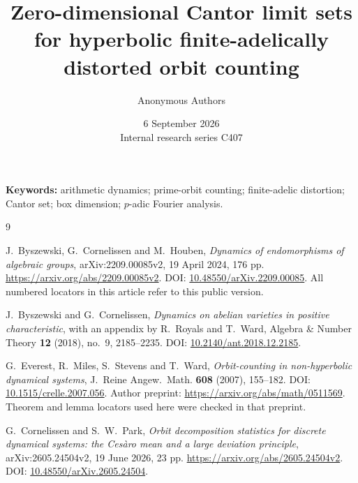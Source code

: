 \documentclass[11pt]{article}
\title{Zero-dimensional Cantor limit sets for hyperbolic\newline
finite-adelically distorted orbit counting}
\author{Anonymous Authors}
\date{6 September 2026\\[3pt]{\small Internal research series C407}}
\begin{document}
\maketitle
\begin{abstract}

\end{abstract}
\noindent\textbf{Keywords:} arithmetic dynamics; prime-orbit counting;
finite-adelic distortion; Cantor set; box dimension; $p$-adic Fourier analysis.









\begin{thebibliography}{9}

J.~Byszewski, G.~Cornelissen and M.~Houben,
\emph{Dynamics of endomorphisms of algebraic groups},
arXiv:2209.00085v2, 19 April 2024, 176 pp.
\url{https://arxiv.org/abs/2209.00085v2}.
DOI: \href{https://doi.org/10.48550/arXiv.2209.00085}{10.48550/arXiv.2209.00085}.
All numbered locators in this article refer to this public version.

J.~Byszewski and G.~Cornelissen,
\emph{Dynamics on abelian varieties in positive characteristic},
with an appendix by R.~Royals and T.~Ward,
Algebra \& Number Theory \textbf{12} (2018), no.~9, 2185--2235.
DOI: \href{https://doi.org/10.2140/ant.2018.12.2185}{10.2140/ant.2018.12.2185}.

G.~Everest, R.~Miles, S.~Stevens and T.~Ward,
\emph{Orbit-counting in non-hyperbolic dynamical systems},
J.~Reine Angew.~Math. \textbf{608} (2007), 155--182.
DOI: \href{https://doi.org/10.1515/crelle.2007.056}{10.1515/crelle.2007.056}.
Author preprint: \url{https://arxiv.org/abs/math/0511569}.
Theorem and lemma locators used here were checked in that preprint.

G.~Cornelissen and S.~W.~Park,
\emph{Orbit decomposition statistics for discrete dynamical systems:
the Ces\`aro mean and a large deviation principle},
arXiv:2605.24504v2, 19 June 2026, 23 pp.
\url{https://arxiv.org/abs/2605.24504v2}.
DOI: \href{https://doi.org/10.48550/arXiv.2605.24504}{10.48550/arXiv.2605.24504}.

\end{thebibliography}
\end{document}
